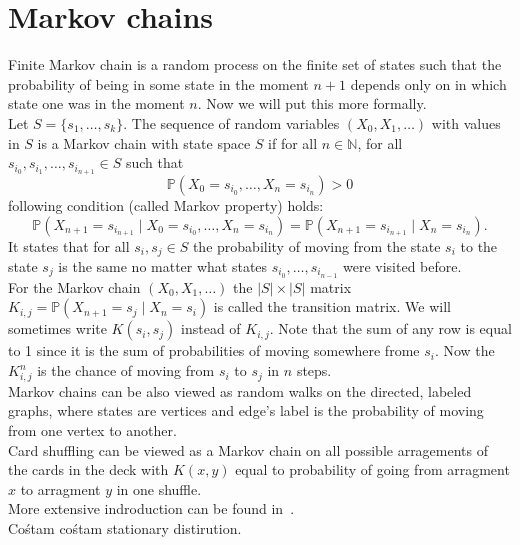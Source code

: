 \documentclass[a4paper, 12pt]{report}
\begin{document}
\chapter{Markov chains}
\setcounter{page}{5}
Finite Markov chain is a random process on the finite set of states such that
the probability of being in some state in the moment $n+1$ depends only on in which state one was
in the moment $n$. Now we will put this more formally.\\
Let $S = \{s_1, \dots, s_k\}$. The sequence of random variables $(X_0, X_1, \dots)$ with values in $S$
is a Markov chain with state space $S$ if for all $n \in \mathbb{N}$,
for all $s_{i_0}, s_{i_1}, \dots, s_{i_{n+1}} \in S$ such that
\begin{equation*}
\mathbb{P}(X_0 = s_{i_0}, \dots, X_n = s_{i_n}) > 0
\end{equation*}
following condition (called Markov property) holds:
\begin{equation}
\mathbb{P}(X_{n+1} = s_{i_{n+1}} \mid X_0 = s_{i_0}, \dots, X_n = s_{i_n}) =
\mathbb{P}(X_{n+1} = s_{i_{n+1}} \mid X_n = s_{i_n}).
\end{equation}
It states that for all $s_i, s_j \in S$ the probability of moving from the state
$s_i$ to the state $s_j$ is the same no matter what states $s_{i_0}, \dots, s_{i_{n-1}}$
were visited before. \\
For the Markov chain $(X_0, X_1, \dots)$ the $|S| \times |S|$ matrix
$K_{i,j} = \mathbb{P}(X_{n+1} = s_j \mid X_n = s_i)$ is called the transition matrix. We will sometimes
write $K(s_i, s_j)$ instead of $K_{i,j}$. Note that the sum of
any row is equal to 1 since it is the sum of probabilities of moving somewhere frome $s_i$.
Now the $K^n_{i,j}$ is the chance of moving from $s_i$ to $s_j$ in $n$ steps. \\
Markov chains can be also viewed as random walks on the directed, labeled graphs, where states are vertices
and edge's label is the probability of moving from one vertex to another. \\
Card shuffling can be viewed as a Markov chain on all possible arragements of the cards
in the deck with $K(x,y)$ equal to probability of going from arragment $x$ to arragment $y$ in one shuffle.
\\ More extensive indroduction can be found in~\cite{LePeWi}. \\
Cośtam cośtam stationary distirution. \\
\end{document}
